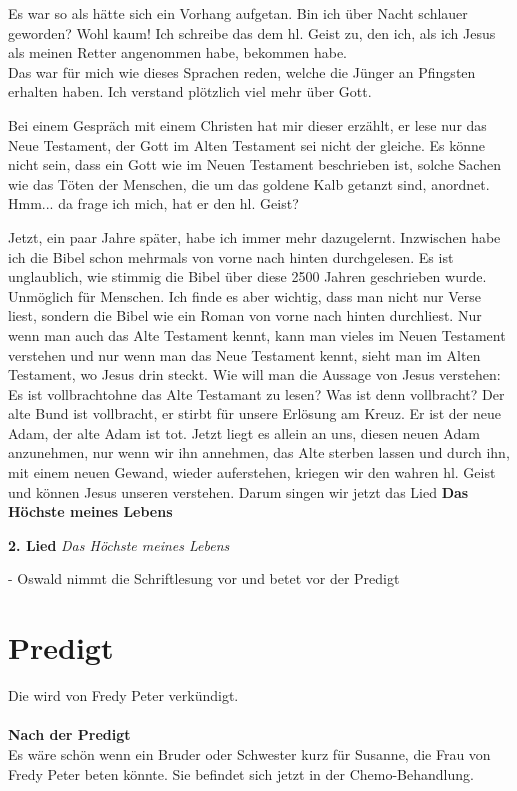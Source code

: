 \documentclass[12pt,a4paper]{scrarticle}
\begin{document}
Es war so als hätte sich ein Vorhang aufgetan. Bin ich über Nacht schlauer geworden? Wohl kaum! Ich schreibe das dem hl. Geist zu, den ich, als ich Jesus als meinen Retter angenommen habe, bekommen habe.\\
Das war für mich wie dieses Sprachen reden, welche die Jünger an Pfingsten erhalten haben. Ich verstand plötzlich viel mehr über Gott.

Bei einem Gespräch mit einem Christen hat mir dieser erzählt, er lese nur das Neue Testament, der Gott im Alten Testament sei nicht der gleiche. Es könne nicht sein, dass ein Gott wie im Neuen Testament beschrieben ist, solche Sachen wie das Töten der Menschen, die um das goldene Kalb getanzt sind, anordnet. Hmm... da frage ich mich, hat er den hl. Geist? 

Jetzt, ein paar Jahre später, habe ich immer mehr dazugelernt. Inzwischen habe ich die Bibel schon mehrmals von vorne nach hinten durchgelesen. Es ist unglaublich, wie stimmig die Bibel über diese 2500 Jahren geschrieben wurde. Unmöglich für Menschen. Ich finde es aber wichtig, dass man nicht nur Verse liest, sondern die Bibel wie ein Roman von vorne nach hinten durchliest. Nur wenn man auch das Alte Testament kennt, kann man vieles im Neuen Testament verstehen und nur wenn man das Neue Testament kennt, sieht man im Alten Testament, wo Jesus drin steckt. Wie will man die Aussage von Jesus verstehen: \glqq{}Es ist vollbracht\grqq ohne das Alte Testamant zu lesen? Was ist denn vollbracht? Der alte Bund ist vollbracht, er stirbt für unsere Erlösung am Kreuz. Er ist der neue Adam, der alte Adam ist tot. Jetzt liegt es allein an uns, diesen neuen Adam anzunehmen, nur wenn wir ihn annehmen, das Alte sterben lassen und durch ihn, mit einem neuen Gewand, wieder auferstehen, kriegen wir den wahren hl. Geist und können Jesus unseren \herr{} verstehen.
Darum singen wir jetzt das Lied \textbf{Das Höchste meines Lebens}

\textbf{2. Lied} \textit{Das Höchste meines Lebens}

- Oswald nimmt die Schriftlesung vor und betet vor der Predigt

\section{Predigt}
Die wird von Fredy Peter verkündigt.
\\
\\
\textbf{Nach der Predigt}\\
Es wäre schön wenn ein Bruder oder Schwester kurz für Susanne, die Frau von Fredy Peter beten könnte. 
Sie befindet sich jetzt in der Chemo-Behandlung.
\end{document}
